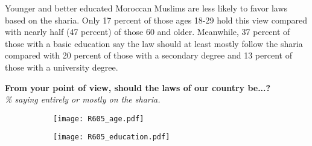 \documentclass[12pt]{article}
\begin{document}
	\noindent Younger and better educated Moroccan Muslims are less likely to favor laws based on the sharia. Only 17 percent of those ages 18-29 hold this view compared with nearly half (47 percent) of those 60 and older. Meanwhile, 37 percent of those with a basic education say the law should at least mostly follow the sharia compared with 20 percent of those with a secondary degree and 13 percent of those with a university degree.
			
	\pagebreak
	\begin{center}
		{\textbf{From your point of view, should the laws of our country be...?}}\\
		\emph{\% saying entirely or mostly on the sharia.}
	\end{center}
	\begin{figure}[H]
		\hspace{-1cm}\begin{minipage}{0.5\linewidth}
			\begin{figure}[H]
				\centering
				\texttt{[image: R605\_age.pdf]} 
			\end{figure}
		\end{minipage}
		\begin{minipage}{0.4\linewidth}
			\begin{figure}[H]
				\texttt{[image: R605\_education.pdf]}
			\end{figure}
		\end{minipage}
	\end{figure}
\end{document}
